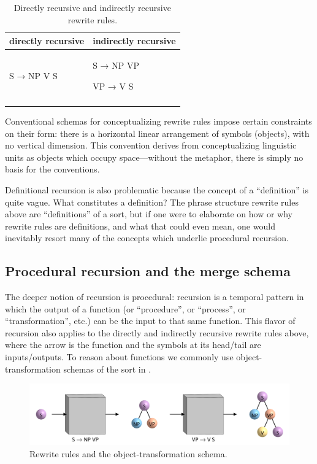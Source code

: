 \begin{table}
\begin{tabularx}{\textwidth}{XX}
\lsptoprule
directly recursive & indirectly recursive\\
\midrule 
S → NP V S & S → NP VP

VP →  V S\\
\lspbottomrule
\end{tabularx}
\caption{Directly recursive and indirectly recursive rewrite rules.}\label{tab:5:2}
\end{table}
  
  Conventional schemas for conceptualizing rewrite rules impose certain constraints on their form: there is a horizontal linear arrangement of symbols (objects), with no vertical dimension. This convention derives from conceptualizing linguistic units as objects which occupy space—without the metaphor, there is simply no basis for the conventions.

  Definitional recursion is also problematic because the concept of a “definition” is quite vague. What constitutes a definition? The phrase structure rewrite rules above are “definitions” of a sort, but if one were to elaborate on how or why rewrite rules are definitions, and what that could even mean, one would inevitably resort many of the concepts which underlie procedural recursion.

\subsection{Procedural recursion and the merge schema}

The deeper notion of recursion is procedural: recursion is a temporal pattern in which the output of a function (or “procedure”, or “process”, or “transformation”, etc.) can be the input to that same function. This flavor of recursion also applies to the directly and indirectly recursive rewrite rules above, where the arrow is the function and the symbols at its head/tail are inputs/outputs. To reason about functions we commonly use object-transformation schemas of the sort in {}.

  
\begin{figure}
\includegraphics[width=\textwidth]{figures/Tilsen-img107.png}
\caption{Rewrite rules and the object-transformation schema.}
\label{fig:5:3}
\end{figure}
 

